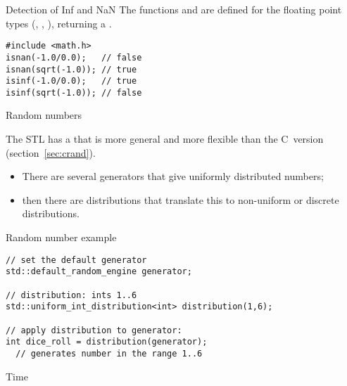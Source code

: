 \begin{block}{Detection of Inf and NaN}
  The functions  and  are
  defined for the floating point types (, , ), returning a .
\begin{lstlisting}
#include <math.h>
isnan(-1.0/0.0);   // false
isnan(sqrt(-1.0)); // true
isinf(-1.0/0.0);   // true
isinf(sqrt(-1.0)); // false
\end{lstlisting}
\end{block}

 {Random numbers}
\label{sec:stl:random}

The \ac{STL} has a
that is more general and more flexible than the C~version (section~\ref{sec:crand}).
\begin{itemize}
\item There are several generators that give uniformly distributed
  numbers;
\item then there are distributions that translate this to non-uniform
  or discrete distributions.
\end{itemize}

\begin{block}{Random number example}
  \label{sl:stl:rand16}
\begin{lstlisting}
// set the default generator
std::default_random_engine generator;

// distribution: ints 1..6
std::uniform_int_distribution<int> distribution(1,6);

// apply distribution to generator:
int dice_roll = distribution(generator);
  // generates number in the range 1..6 
\end{lstlisting}
\end{block}

 {Time}

